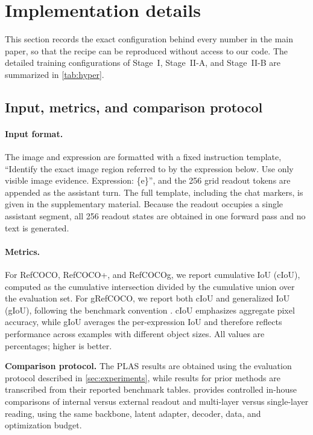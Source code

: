 \section{Implementation details}
\label{sec:appendix_impl}

This section records the exact configuration behind every number in the main paper, so that the recipe can be reproduced without access to our code. The detailed training configurations of
Stage~I, Stage~II-A, and Stage~II-B
are summarized in \cref{tab:hyper}.

\subsection{Input, metrics, and comparison protocol}
\label{sec:app_protocol}

\paragraph{Input format.}
The image and expression are formatted with a fixed instruction template, ``Identify the exact image region referred to by the expression below. Use only visible image evidence. Expression: \{e\}'', and the 256 grid readout tokens are appended as the assistant turn. The full template, including the chat markers, is given in the supplementary material. Because the readout occupies a single assistant segment, all 256 readout states are obtained in one forward pass and no text is generated.

\paragraph{Metrics.}
For RefCOCO, RefCOCO+, and RefCOCOg, we report cumulative IoU (cIoU), computed as the cumulative intersection divided by the cumulative union over the evaluation set. For gRefCOCO, we report both cIoU and generalized IoU (gIoU), following the benchmark convention \cite{Liu2023GRES}. cIoU emphasizes aggregate pixel accuracy, while gIoU averages the per-expression IoU and therefore reflects performance across examples with different object sizes. All values are percentages; higher is better.

\noindent\textbf{Comparison protocol.}
The PLAS results are obtained using the evaluation
protocol described in \cref{sec:experiments},
while results for prior methods are transcribed
from their reported benchmark tables.
 provides controlled
in-house comparisons of internal versus external
readout and multi-layer versus single-layer reading,
using the same backbone, latent adapter, decoder,
data, and optimization budget.

